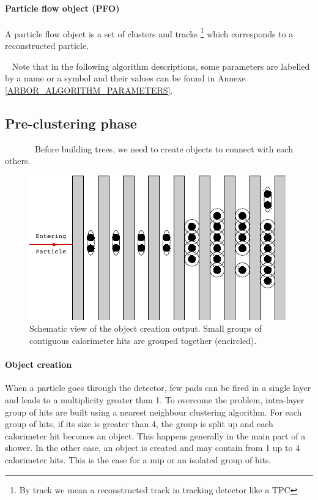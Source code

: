 \documentclass[cits]{JINST}
\begin{document}
\paragraph*{Particle flow object (PFO)} A particle flow object is a set of clusters and tracks \footnote{By track we mean a reconstructed track in tracking detector like a TPC} which corresponds to a reconstructed particle.

~\newline 
Note that in the following algorithm descriptions, some parameters are labelled by a name or a symbol and their values can be found in Annexe \ref{ARBOR_ALGORITHM_PARAMETERS}.

\subsection{Pre-clustering phase} 

~~~~~~~Before building trees, we need to create objects to connect with each others.

\begin{figure}
  \vspace{-20pt}
  \begin{center}
    \includegraphics[width=\linewidth]{ObjectCreationAfter.pdf}
  \end{center}
  \vspace{-10pt}
  \caption{\label{ARBOR_OBJECT_CREATION} Schematic view of the object creation output. Small groups of contiguous calorimeter hits are grouped together (encircled).}
  \vspace{-20pt}
\end{figure}

\paragraph*{Object creation} When a particle goes through the detector, few pads can be fired in a single layer and leads to a multiplicity greater than 1. To overcome the problem, intra-layer group of hits are built using a nearest neighbour clustering algorithm. For each group of hits, if its size is greater than 4, the group is split up and each calorimeter hit becomes an object. This happens generally in the main part of a shower. In the other case, an object is created and may contain from 1 up to 4 calorimeter hits. This is the case for a mip or an isolated group of hits.
\end{document}
